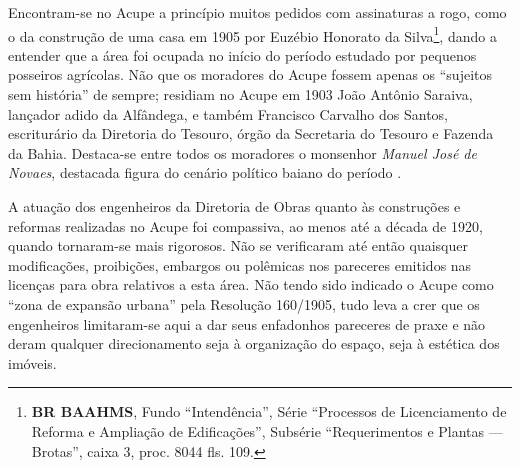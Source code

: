 












Encontram-se no Acupe a princípio muitos pedidos com assinaturas a rogo, como o da construção de uma casa em 1905 por Euzébio Honorato da Silva\footnote{\textbf{BR BAAHMS}, Fundo ``Intendência'', Série ``Processos de Licenciamento de Reforma e Ampliação de Edificações'', Subsérie ``Requerimentos e Plantas --- Brotas'', caixa 3, proc. 8044 fls. 109.}, dando a entender que a área foi ocupada no início do período estudado por pequenos posseiros agrícolas. Não que os moradores do Acupe fossem apenas os ``sujeitos sem história'' de sempre; residiam no Acupe em 1903 João Antônio Saraiva, lançador adido da Alfândega, e também Francisco Carvalho dos Santos, escriturário da Diretoria do Tesouro, órgão da Secretaria do Tesouro e Fazenda da Bahia. Destaca-se entre todos os moradores o monsenhor \textit{Manuel José de Novaes}, destacada figura do cenário político baiano do período \cite{reis_almanak_1903}.


A atuação dos engenheiros da Diretoria de Obras quanto às construções e reformas realizadas no Acupe foi compassiva, ao menos até a década de 1920, quando tornaram-se mais rigorosos. Não se verificaram até então quaisquer modificações, proibições, embargos ou polêmicas nos pareceres emitidos nas licenças para obra relativos a esta área. Não tendo sido indicado o Acupe como ``zona de expansão urbana'' pela Resolução 160/1905, tudo leva a crer que os engenheiros limitaram-se aqui a dar seus enfadonhos pareceres de praxe e não deram qualquer direcionamento seja à organização do espaço, seja à estética dos imóveis.

